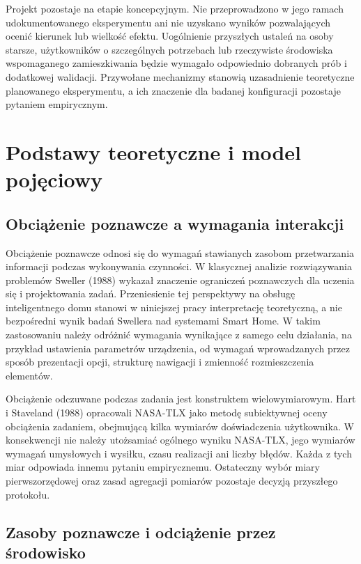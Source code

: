 \documentclass[11pt,a4paper]{article}
\begin{document}
Projekt pozostaje na etapie koncepcyjnym. Nie przeprowadzono w jego ramach udokumentowanego eksperymentu ani nie uzyskano wyników pozwalających ocenić kierunek lub wielkość efektu. Uogólnienie przyszłych ustaleń na osoby starsze, użytkowników o szczególnych potrzebach lub rzeczywiste środowiska wspomaganego zamieszkiwania będzie wymagało odpowiednio dobranych prób i dodatkowej walidacji. Przywołane mechanizmy stanowią uzasadnienie teoretyczne planowanego eksperymentu, a ich znaczenie dla badanej konfiguracji pozostaje pytaniem empirycznym.

\section{Podstawy teoretyczne i model pojęciowy}

\subsection{Obciążenie poznawcze a wymagania interakcji}

Obciążenie poznawcze odnosi się do wymagań stawianych zasobom przetwarzania informacji podczas wykonywania czynności. W klasycznej analizie rozwiązywania problemów Sweller (1988) wykazał znaczenie ograniczeń poznawczych dla uczenia się i projektowania zadań. Przeniesienie tej perspektywy na obsługę inteligentnego domu stanowi w niniejszej pracy interpretację teoretyczną, a nie bezpośredni wynik badań Swellera nad systemami Smart Home. W takim zastosowaniu należy odróżnić wymagania wynikające z samego celu działania, na przykład ustawienia parametrów urządzenia, od wymagań wprowadzanych przez sposób prezentacji opcji, strukturę nawigacji i zmienność rozmieszczenia elementów.

Obciążenie odczuwane podczas zadania jest konstruktem wielowymiarowym. Hart i Staveland (1988) opracowali NASA-TLX jako metodę subiektywnej oceny obciążenia zadaniem, obejmującą kilka wymiarów doświadczenia użytkownika. W konsekwencji nie należy utożsamiać ogólnego wyniku NASA-TLX, jego wymiarów wymagań umysłowych i wysiłku, czasu realizacji ani liczby błędów. Każda z tych miar odpowiada innemu pytaniu empirycznemu. Ostateczny wybór miary pierwszorzędowej oraz zasad agregacji pomiarów pozostaje decyzją przyszłego protokołu.

\subsection{Zasoby poznawcze i odciążenie przez środowisko}
\end{document}
